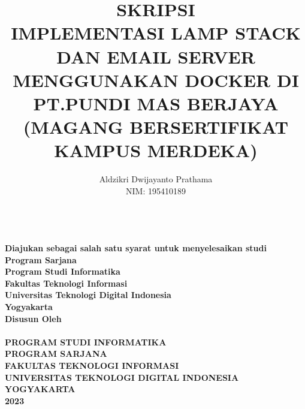 \documentclass[../SKRIPSI_ALDZIKRI_DWIJAYANTO_PRATHAMA.tex]{subfiles}
\begin{document}
\setcounter{page}{1}
\title{{\Large SKRIPSI\\
  \Large{IMPLEMENTASI
  LAMP STACK DAN EMAIL SERVER MENGGUNAKAN DOCKER DI PT.PUNDI
  MAS BERJAYA\\}\large{(MAGANG BERSERTIFIKAT KAMPUS MERDEKA)}}}
\author{Aldzikri Dwijayanto Prathama
    \\NIM: 195410189}
\makeatletter
\begin{titlepage}
    \begin{center}
        {\huge \bfseries \@title}\\[4ex]
        {\large \bfseries Diajukan sebagai salah satu syarat
        untuk menyelesaikan studi\\ Program Sarjana\\
        Program Studi Informatika\\ Fakultas Teknologi Informasi\\
        Universitas Teknologi Digital Indonesia\\
        Yogyakarta}\\[4ex]
        {\large \bfseries Disusun Oleh\\ \@author}\\[5ex]
        {\large \bfseries {PROGRAM STUDI INFORMATIKA\\
        PROGRAM SARJANA\\
        FAKULTAS TEKNOLOGI INFORMASI\\
        UNIVERSITAS TEKNOLOGI DIGITAL INDONESIA\\
        YOGYAKARTA\\
        2023}}
    \end{center}
\end{titlepage}
\makeatother
\end{document}
